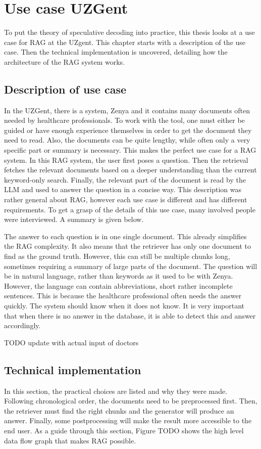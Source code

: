 
\chapter{Use case UZGent}
To put the theory of speculative decoding into practice, this thesis looks at a use case for RAG at the UZgent. This chapter starts with a description of the use case. Then the technical implementation is uncovered, detailing how the architecture of the RAG system works.

\section{Description of use case}
In the UZGent, there is a system, Zenya and it contains many documents often needed by healthcare professionals. To work with the tool, one must either be guided or have enough experience themselves in order to get the document they need to read. Also, the documents can be quite lengthy, while often only a very specific part or summary is necessary. This makes the perfect use case for a RAG system. In this RAG system, the user first poses a question. Then the retrieval fetches the relevant documents based on a deeper understanding than the current keyword-only search. Finally, the relevant part of the document is read by the LLM and used to answer the question in a concise way. This description was rather general about RAG, however each use case is different and has different requirements. To get a grasp of the details of this use case, many involved people were interviewed. A summary is given below.

The answer to each question is in one single document. This already simplifies the RAG complexity. It also means that the retriever has only one document to find as the ground truth. However, this can still be multiple chunks long, sometimes requiring a summary of large parts of the document.
The question will be in natural language, rather than keywords as it used to be with Zenya. However, the language can contain abbreviations, short rather incomplete sentences. This is because the healthcare professional often needs the answer quickly.
The system should know when it does not know. It is very important that when there is no answer in the database, it is able to detect this and answer accordingly.

TODO update with actual input of doctors


\section{Technical implementation}
In this section, the practical choices are listed and why they were made. Following chronological order, the documents need to be preprocessed first. Then, the retriever must find the right chunks and the generator will produce an answer. Finally, some postprocessing will make the result more accessible to the end user. As a guide through this section, Figure TODO shows the high level data flow graph that makes RAG possible.


